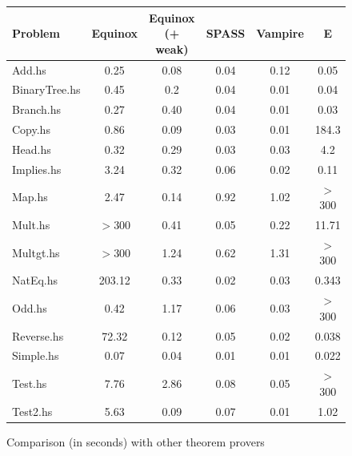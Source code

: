 \documentclass[preprint]{sigplanconf}
\begin{document}
\begin{figure}
\begin{center}
    \begin{tabular}{l|c|c|c|c|c}
      Problem & Equinox & Equinox (+ weak) & SPASS & Vampire & E \\
      \hline
      Add.hs & 0.25 & 0.08 & 0.04 & 0.12 & 0.05\\
      BinaryTree.hs & 0.45 & 0.2 & 0.04 & 0.01 & 0.04 \\
      Branch.hs & 0.27 & 0.40 & 0.04 & 0.01 & 0.03 \\
      Copy.hs & 0.86 & 0.09 & 0.03 & 0.01 & 184.3 \\
      Head.hs & 0.32 & 0.29 & 0.03 & 0.03 & 4.2 \\
      Implies.hs & 3.24 & 0.32 & 0.06 & 0.02 & 0.11 \\
      Map.hs & 2.47 & 0.14 & 0.92 & 1.02 & $>$300 \\
      Mult.hs & $>$300 & 0.41 & 0.05 & 0.22 & 11.71 \\
      Multgt.hs & $>$300 & 1.24 & 0.62 & 1.31 & $>$300 \\
      NatEq.hs & 203.12 & 0.33 & 0.02 & 0.03 & 0.343 \\
      Odd.hs & 0.42 & 1.17 & 0.06 & 0.03 & $>$300 \\
      Reverse.hs & 72.32 & 0.12 & 0.05 & 0.02 & 0.038 \\
      Simple.hs & 0.07 & 0.04 & 0.01 & 0.01 & 0.022 \\
      Test.hs & 7.76 & 2.86 & 0.08 & 0.05 & $>$300 \\
      Test2.hs & 5.63 & 0.09 & 0.07 & 0.01 & 1.02 \\
    \end{tabular}
\end{center}
\caption{Comparison (in seconds) with other theorem provers}
\label{comparison}
\end{figure}
\end{document}
